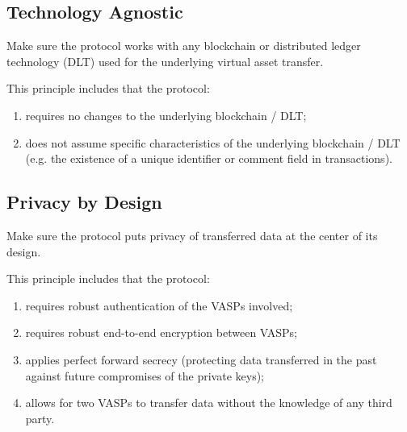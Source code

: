 \documentclass{article}
\begin{document}
\subsection{Technology Agnostic}
    \begin{mdframed}[backgroundcolor=gray!20] 
    Make sure the protocol works with any blockchain or distributed ledger technology (DLT) used for the underlying virtual asset transfer.
    \end{mdframed}
This principle includes that the protocol:
\renewcommand{\theenumi}{\alph{enumi}}
 \begin{enumerate}
   \item requires no changes to the underlying blockchain / DLT;
   \item does not assume specific characteristics of the underlying blockchain / DLT (e.g. the existence of a unique identifier or comment field in transactions).
  \end{enumerate}
  \newpage
  
\subsection{Privacy by Design}
    \begin{mdframed}[backgroundcolor=gray!20] 
    Make sure the protocol puts privacy of transferred data at the center of its design.
    \end{mdframed}
This principle includes that the protocol:
\renewcommand{\theenumi}{\alph{enumi}}
 \begin{enumerate}
   \item requires robust authentication of the VASPs involved;
   \item requires robust end-to-end encryption between VASPs;
   \item applies perfect forward secrecy (protecting data transferred in the past against future compromises of the private keys);
   \item allows for two VASPs to transfer data without the knowledge of any third party.
  \end{enumerate}
  
\end{document}
